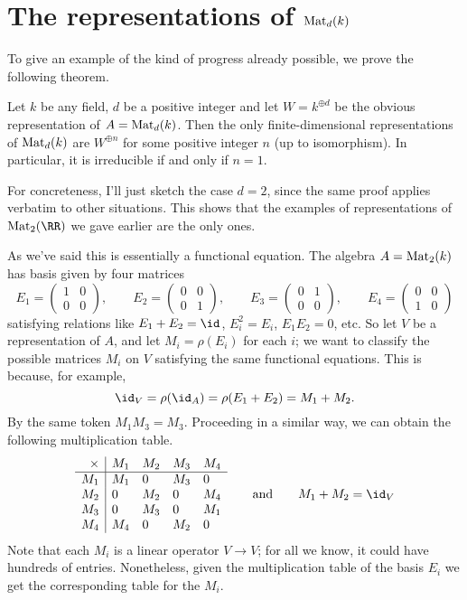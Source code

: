 \section{The representations of $\mathrm{Mat}_d(k)$}
To give an example of the kind of progress already possible,
we prove the following theorem.
\begin{theorem}
	\label{thm:rep_1mat}
	Let $k$ be any field, $d$ be a positive integer and
	let $W = k^{\oplus d}$ be the obvious representation of $A = \mathrm{Mat}_d(k)$.
	Then the only finite-dimensional representations
	of $\mathrm{Mat}_d(k)$ are $W^{\oplus n}$
	for some positive integer $n$ (up to isomorphism).
	In particular, it is irreducible if and only if $n=1$.
\end{theorem}
For concreteness, I'll just sketch the case $d=2$,
since the same proof applies verbatim to other situations.
This shows that the examples of representations of $\Mat_2(\RR)$
we gave earlier are the only ones.

As we've said this is essentially a functional equation.
The algebra $A = \mathrm{Mat}_2(k)$ has basis given by four matrices
\[
	E_1 = \begin{pmatrix} 1 & 0 \\ 0 & 0 \end{pmatrix},
	\qquad
	E_2 = \begin{pmatrix} 0 & 0 \\ 0 & 1 \end{pmatrix},
	\qquad
	E_3 = \begin{pmatrix} 0 & 1 \\ 0 & 0 \end{pmatrix},
	\qquad
	E_4 = \begin{pmatrix} 0 & 0 \\ 1 & 0 \end{pmatrix}
\]
satisfying relations like $E_1 + E_2 = \id$, $E_i^2 = E_i$, $E_1E_2 = 0$, etc.
So let $V$ be a representation of $A$, and let $M_i = \rho(E_i)$ for each $i$;
we want to classify the possible matrices $M_i$ on $V$
satisfying the same functional equations.
This is because, for example,
\[ \id_V = \rho(\id_A) = \rho(E_1+E_2) = M_1 + M_2. \]
By the same token $M_1M_3 = M_3$.
Proceeding in a similar way, we can obtain the following multiplication table.
\[
	\begin{array}{r|llll}
		\times & M_1 & M_2 & M_3 & M_4 \\ \hline
		M_1 & M_1 & 0 & M_3 & 0 \\
		M_2 & 0 & M_2 & 0 & M_4 \\
		M_3 & 0 & M_3 & 0 & M_1 \\
		M_4 & M_4 & 0 & M_2 & 0
	\end{array}
	\qquad \text{and} \qquad
	M_1 + M_2 = \id_V
\]
Note that each $M_i$ is a linear operator $V \to V$;
for all we know, it could have hundreds of entries.
Nonetheless, given the multiplication table of the basis $E_i$
we get the corresponding table for the $M_i$.

